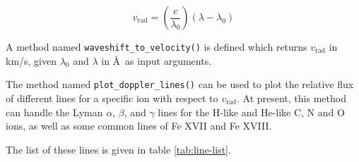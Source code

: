                 \begin{equation}
                    v_\text{rad}=\left( \dfrac{c}{\lambda_0} \right)(\lambda-\lambda_0) \label{eqn-vrad}
                \end{equation}
                
                A method named \texttt{waveshift\_to\_velocity()} is defined which returns $v_\text{rad}$ in km/s, given $\lambda_0$ and $\lambda$ in \AA~as input arguments.
                
                The method named \texttt{plot\_doppler\_lines()} can be used to plot the relative flux of different lines for a specific ion with respect to $v_\text{rad}$. At present, this method can handle the Lyman $\alpha$, $\beta$, and $\gamma$ lines for the H-like and He-like C, N and O ions, as well as some common lines of Fe XVII and Fe XVIII.
                
                The list of these lines is given in table \ref{tab:line-list}.
                
